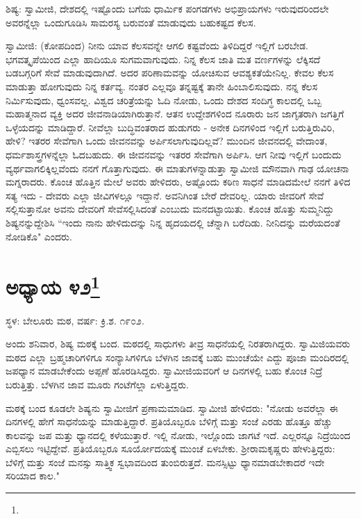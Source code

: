 ಶಿಷ್ಯ: ಸ್ವಾಮೀಜಿ, ದೇಶದಲ್ಲಿ ಇಷ್ಟೊಂದು ಬಗೆಯ ಧಾರ್ಮಿಕ ಪಂಗಡಗಳು ಅಭಿಪ್ರಾಯಗಳು ಇರುವುದರಿಂದಲೇ ಅವರನ್ನೆಲ್ಲಾ ಒಂದುಗೂಡಿಸಿ ಸಾಮರಸ್ಯ ಬರುವಂತೆ ಮಾಡುವುದು ಬಹುಕಷ್ಟದ ಕೆಲಸ.

ಸ್ವಾಮೀಜಿ: (ಕೋಪದಿಂದ) ನೀನು ಯಾವ ಕೆಲಸವನ್ನೇ ಆಗಲಿ ಕಷ್ಟವೆಂದು ತಿಳಿದಿದ್ದರೆ ಇಲ್ಲಿಗೆ ಬರಬೇಡ. ಭಗವತ್ಕೃಪೆಯಿಂದ ಎಲ್ಲಾ ಹಾದಿಯೂ ಸುಗಮವಾಗುವುದು. ನಿನ್ನ ಕೆಲಸ ಜಾತಿ ಮತ ವರ್ಣಗಳನ್ನು ಲೆಕ್ಕಿಸದೆ ಬಡಬಗ್ಗರಿಗೆ ಸೇವೆ ಮಾಡುವುದಾಗಿದೆ. ಅದರ ಪರಿಣಾಮವನ್ನು ಯೋಚಿಸುವ ಆವಶ್ಯಕತೆಯೇನಿಲ್ಲ. ಕೇವಲ ಕೆಲಸ ಮಾಡುತ್ತಾ ಹೋಗುವುದು ನಿನ್ನ ಕರ್ತವ್ಯ. ನಂತರ ಎಲ್ಲವೂ ತನ್ನಷ್ಟಕ್ಕೆ ತಾನೇ ಹಿಂಬಾಲಿಸುವುದು. ನನ್ನ ಕೆಲಸ ನಿರ್ಮಿಸುವುದು, ಧ್ವಂಸವಲ್ಲ. ವಿಶ್ವದ ಚರಿತ್ರೆಯನ್ನು ಓದಿ ನೋಡು, ಒಂದು ದೇಶದ ಸಂದಿಗ್ಧ ಕಾಲದಲ್ಲಿ ಒಬ್ಬ ಮಹಾತ್ಮನಾದ ವ್ಯಕ್ತಿ ಅದರ ಜೀವನಾಡಿಯಾಗಿರುತ್ತಾನೆ. ಆತನ ಉದ್ದೇಶಗಳಿಂದ ನೂರಾರು ಜನ ಜಾಗೃತರಾಗಿ ಜಗತ್ತಿಗೆ ಒಳ್ಳೆಯದನ್ನು ಮಾಡಿದ್ದಾರೆ. ನೀವೆಲ್ಲಾ ಬುದ್ಧಿವಂತರಾದ ಹುಡುಗರು - ಅನೇಕ ದಿನಗಳಿಂದ ಇಲ್ಲಿಗೆ ಬರುತ್ತಿರುವಿರಿ, ಹೇಳಿ? ಇತರರ ಸೇವೆಗಾಗಿ ಒಂದು ಜೀವನವನ್ನು ಅರ್ಪಿಸಲಾಗುವುದಿಲ್ಲವೆ? ಮುಂದಿನ ಜೀವನದಲ್ಲಿ ವೇದಾಂತ, ಧರ್ಮಶಾಸ್ತ್ರಗಳನ್ನೆಲ್ಲಾ ಓದಬಹುದು. ಈ ಜೀವನವನ್ನು ಇತರರ ಸೇವೆಗಾಗಿ ಅರ್ಪಿಸಿ. ಆಗ ನೀವು ಇಲ್ಲಿಗೆ ಬಂದುದು ವ್ಯರ್ಥವಾಗಲಿಕ್ಕಿಲ್ಲವೆಂದು ನನಗೆ ಗೊತ್ತಾಗುವುದು. ಈ ಮಾತುಗಳನ್ನಾಡುತ್ತಾ ಸ್ವಾಮೀಜಿ ಮೌನವಾಗಿ ಗಾಢ ಯೋಚನಾ ಮಗ್ನರಾದರು. ಕೊಂಚ ಹೊತ್ತಿನ ಮೇಲೆ ಅವರು ಹೇಳಿದರು, ಅಷ್ಟೊಂದು ಕಠಿಣ ಸಾಧನೆ ಮಾಡಿದಮೇಲೆ ನನಗೆ ತಿಳಿದ ಸತ್ಯ ಇದು - ದೇವರು ಎಲ್ಲಾ ಜೀವಿಗಳಲ್ಲೂ ಇದ್ದಾನೆ. ಅವನಿಗಿಂತ ಬೇರೆ ದೇವರಿಲ್ಲ. ಯಾರು ಜೀವರಿಗೆ ಸೇವೆ ಸಲ್ಲಿಸುತ್ತಾನೋ ಅವನು ದೇವರಿಗೆ ಸೇವೆಸಲ್ಲಿಸಿದಂತೆ ಎಂಬುದು ಮನದಟ್ಟಾಯಿತು. ಕೊಂಚ ಹೊತ್ತು ಸುಮ್ಮನಿದ್ದು ಶಿಷ್ಯನನ್ನುದ್ದೇಶಿಸಿ “ಇಂದು ನಾನು ಹೇಳಿದುದನ್ನು ನಿನ್ನ ಹೃದಯದಲ್ಲಿ ಚೆನ್ನಾಗಿ ಬರೆದಿಡು. ನೀನಿದನ್ನು ಮರೆಯದಂತೆ ನೋಡಿಕೊ" ಎಂದರು.

\newpage

\chapter[ಅಧ್ಯಾಯ ೪೨]{ಅಧ್ಯಾಯ ೪೨\protect\footnote{}}

\centerline{ಸ್ಥಳ: ಬೇಲೂರು ಮಠ, ವರ್ಷ: ಕ್ರಿ.ಶ. ೧೯೦೨.}

ಅಂದು ಶನಿವಾರ, ಶಿಷ್ಯ ಮಠಕ್ಕೆ ಬಂದ. ಮಠದಲ್ಲಿ ಸಾಧುಗಳು ತೀವ್ರ ಸಾಧನೆಯಲ್ಲಿ ನಿರತರಾಗಿದ್ದರು. ಸ್ವಾಮಿಜಿಯವರು ಮಠದ ಎಲ್ಲಾ ಬ್ರಹ್ಮಚಾರಿಗಳಿಗೂ ಸಂನ್ಯಾಸಿಗಳಿಗೂ ಬೆಳಗಿನ ಜಾವಕ್ಕೆ ಬಹು ಮುಂಚೆಯೇ ಎದ್ದು ಪೂಜಾ ಮಂದಿರದಲ್ಲಿ ಜಪಧ್ಯಾನ ಮಾಡಬೇಕೆಂದು ಅಪ್ಪಣೆ ಹೊರಡಿಸಿದ್ದರು. ಸ್ವಾಮೀಜಿಯವರಿಗೆ ಆ ದಿನಗಳಲ್ಲಿ ಬಹು ಕೊಂಚ ನಿದ್ರೆ ಬರುತ್ತಿತ್ತು. ಬೆಳಗಿನ ಜಾವ ಮೂರು ಗಂಟೆಗೆಲ್ಲಾ ಏಳುತ್ತಿದ್ದರು.

ಮಠಕ್ಕೆ ಬಂದ ಕೂಡಲೇ ಶಿಷ್ಯನು ಸ್ವಾಮೀಜಿಗೆ ಪ್ರಣಾಮಮಾಡಿದ. ಸ್ವಾಮೀಜಿ ಹೇಳಿದರು: "ನೋಡು ಅವರೆಲ್ಲಾ ಈ ದಿನಗಳಲ್ಲಿ ಹೇಗೆ ಸಾಧನೆಯನ್ನು ಮಾಡುತ್ತಿದ್ದಾರೆ. ಪ್ರತಿಯೊಬ್ಬರೂ ಬೆಳಿಗ್ಗೆ ಮತ್ತು ಸಂಜೆ ಎರಡು ಹೊತ್ತೂ ಹೆಚ್ಚು ಕಾಲವನ್ನು ಜಪ ಮತ್ತು ಧ್ಯಾನದಲ್ಲಿ ಕಳೆಯುತ್ತಾರೆ. ಇಲ್ಲಿ ನೋಡು, ಇಲ್ಲೊಂದು ಜಾಗಟೆ ಇದೆ. ಎಲ್ಲರನ್ನೂ ನಿದ್ರೆಯಿಂದ ಎಬ್ಬಿಸಲು ಇಟ್ಟಿದ್ದೇವೆ. ಪ್ರತಿಯೊಬ್ಬರೂ ಸೂರ್ಯೋದಯಕ್ಕೆ ಮುಂಚೆ ಏಳಬೇಕು. ಶ‍್ರೀರಾಮಕೃಷ್ಣರು ಹೇಳುತ್ತಿದ್ದರು: ಬೆಳಿಗ್ಗೆ ಮತ್ತು ಸಂಜೆ ಮನಸ್ಸು ಸಾತ್ತ್ವಿಕ ಸ್ವಭಾವದಿಂದ ತುಂಬಿರುತ್ತದೆ. ಮನಸ್ಸಿಟ್ಟು ಧ್ಯಾನಮಾಡಬೇಕಾದರೆ ಇದೇ ಸರಿಯಾದ ಕಾಲ."

